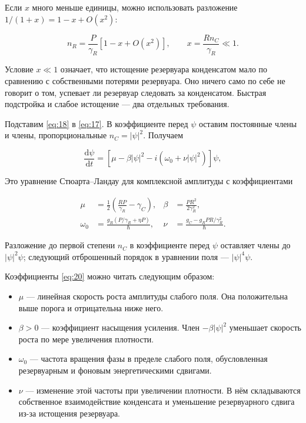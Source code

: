 \documentclass[12pt,a4paper]{article}
\begin{document}
Если $x$ много меньше единицы, можно использовать разложение $1/(1+x)=1-x+O(x^{2})$:

\begin{equation}\label{eq:18}
n_R=\frac{P}{\gamma_R}[1-x+O(x^2)],\qquad x=\frac{Rn_C}{\gamma_R}\ll1.\end{equation}

Условие $x\ll 1$ означает, что истощение резервуара конденсатом мало по сравнению с собственными потерями резервуара. Оно ничего само по себе не говорит о том, успевает ли резервуар следовать за конденсатом. Быстрая подстройка и слабое истощение --- два отдельных требования.

Подставим \eqref{eq:18} в \eqref{eq:17}. В коэффициенте перед $\psi$ оставим постоянные члены и члены, пропорциональные $n_{C}=|\psi|^{2}$. Получаем

\begin{equation}\label{eq:19}
\frac{\mathrm d\psi}{\mathrm dt}=[\mu-\beta|\psi|^2-i(\omega_0+\nu|\psi|^2)]\psi,\end{equation}

Это уравнение Стюарта--Ландау для комплексной амплитуды с коэффициентами

\begin{equation}\label{eq:20}
\begin{aligned}
\mu&=\frac12\left(\frac{RP}{\gamma_R}-\gamma_C\right),&
\beta&=\frac{PR^2}{2\gamma_R^2},\\
\omega_0&=\frac{g_R(P/\gamma_R+\eta P)}{\hbar},&
\nu&=\frac{g_C-g_RPR/\gamma_R^2}{\hbar}.
\end{aligned}\end{equation}

Разложение до первой степени $n_{C}$ в коэффициенте перед $\psi$ оставляет члены до $|\psi|^{2} \psi$; следующий отброшенный порядок в уравнении поля --- $|\psi|^{4} \psi$.

Коэффициенты \eqref{eq:20} можно читать следующим образом:

\begin{itemize}\raggedright\setlength{\itemsep}{3pt}\setlength{\parsep}{0pt}

\item $\mu$ --- линейная скорость роста амплитуды слабого поля. Она положительна выше порога и отрицательна ниже него.

\item $\beta>0$ --- коэффициент насыщения усиления. Член $-\beta|\psi|^{2}$ уменьшает скорость роста по мере увеличения плотности.

\item $\omega_{0}$ --- частота вращения фазы в пределе слабого поля, обусловленная резервуарным и фоновым энергетическими сдвигами.

\item $\nu$ --- изменение этой частоты при увеличении плотности. В нём складываются собственное взаимодействие конденсата и уменьшение резервуарного сдвига из-за истощения резервуара.

\end{itemize}
\end{document}
